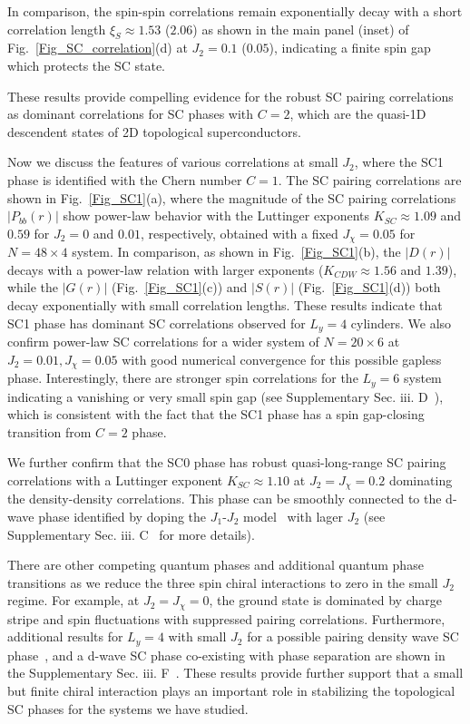 \documentclass[aps,prx,reprint,superscriptaddress,showpacs]{revtex4-2}
\newcommand{\oim}[1]{{\color{blue} #1}}
\begin{document}
In comparison, the spin-spin correlations remain exponentially decay with a short correlation length $\xi _{S}\approx 1.53$  ($2.06$) as shown in the main panel (inset) of Fig.~\ref{Fig_SC_correlation}(d) at $J_{2}=0.1$ ($0.05$), indicating a finite spin gap which protects the SC state. \oim{
These results provide compelling evidence for the robust SC pairing correlations as dominant correlations for SC phases
with $C=2$, which are  the quasi-1D descendent states of  2D topological superconductors.

Now we  discuss the  features of various correlations at small $J_{2}$, where the SC1 phase is identified with the Chern number $C=1$.
The SC pairing correlations are shown in Fig.~\ref{Fig_SC1}(a), where the magnitude of the SC pairing correlations  $\left | P_{bb}(r) \right |$ show power-law behavior with the Luttinger exponents $K_{SC}\approx 1.09$ and $0.59$ for $J_{2}=0$ and $0.01$, respectively, obtained with a fixed $J_{\chi}=0.05$ for $N=48\times 4$ system.
In comparison,  as shown in Fig.~\ref{Fig_SC1}(b), the $\left |D(r) \right |$ decays with a power-law relation with larger exponents ($K_{CDW}\approx 1.56$ and $1.39$),
while the  $\left |G(r)\right |$ (Fig.~\ref{Fig_SC1}(c)) and  $|S(r)|$ (Fig.~\ref{Fig_SC1}(d)) both decay exponentially with small correlation lengths.
These results indicate that SC1 phase has dominant SC correlations observed for $L_{y}=4$ cylinders.
We also confirm  power-law SC correlations for a wider system of $N=20\times 6$ at $J_{2}=0.01, J_{\chi }=0.05$ with good numerical convergence for this possible gapless phase.  
Interestingly, there are stronger spin correlations for the $L_{y}=6$ system indicating a vanishing or very small spin gap
(see Supplementary Sec. iii. D~\cite{SuppMaterial}), which is consistent with the fact that the SC1 phase has a spin gap-closing transition from $C=2$ phase.

 

We further confirm that the SC0 phase has robust quasi-long-range SC pairing correlations with a Luttinger exponent $K_{SC}\approx 1.10$ at $J_{2}=J_{\chi}=0.2$ dominating the density-density correlations. This phase can be smoothly connected to the d-wave phase identified by doping the $J_{1}$-$J_{2}$ model~\cite{jiang2021superconductivity} with lager $J_{2}$ (see Supplementary Sec. iii. C~\cite{SuppMaterial} for more details).

There are other competing quantum phases and additional quantum phase transitions 
as we reduce the three spin chiral interactions to zero in the small $J_{2}$ regime. For example, at $J_{2}=J_{\chi }=0$, 
the ground state is dominated by charge stripe and spin fluctuations with suppressed pairing correlations.
Furthermore,  additional results for $L_{y}=4$ with small $J_{2}$ for a possible pairing density wave SC phase~\cite{peng2021gapless}, and a d-wave SC phase co-existing with phase separation are shown in the Supplementary Sec. iii. F~\cite{SuppMaterial}.
These results provide further support that a small but finite chiral interaction plays an important role in stabilizing the topological SC phases for the systems we have studied.   }
\end{document}
